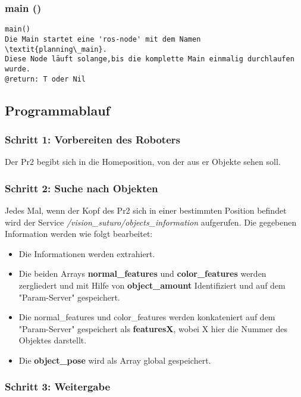 \documentclass{suturo}
\begin{document}
\subsubsection{main ()}
\begin{verbatim}
main()
Die Main startet eine 'ros-node' mit dem Namen \textit{planning\_main}.
Diese Node läuft solange,bis die komplette Main einmalig durchlaufen wurde. 
@return: T oder Nil 
\end{verbatim}



\subsection{Programmablauf}
\subsubsection{Schritt 1: Vorbereiten des Roboters}
Der Pr2 begibt sich in die Homeposition, von der aus er Objekte sehen soll. 

\subsubsection{Schritt 2: Suche nach Objekten}
Jedes Mal, wenn der Kopf des Pr2 sich in einer bestimmten Position befindet wird der Service \textit{/vision\_suturo/objects\_information} aufgerufen. Die gegebenen Information werden wie folgt bearbeitet:

\begin{itemize}
\item Die Informationen werden extrahiert.
\item Die beiden Arrays \textbf{normal\_features} und \textbf{color\_features} werden zergliedert und mit Hilfe von \textbf{object\_amount} Identifiziert und auf dem "Param-Server" gespeichert.
\item Die normal\_features und color\_features werden konkateniert auf dem "Param-Server" gespeichert als \textbf{featuresX}, wobei X hier die Nummer des Objektes darstellt.
\item Die \textbf{object\_pose} wird als Array global gespeichert.
\end{itemize}



\subsubsection{Schritt 3: Weitergabe} 
\end{document}
